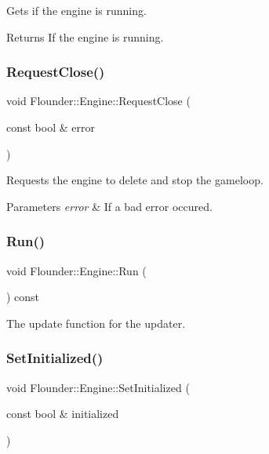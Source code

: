 Gets if the engine is running. 

\begin{DoxyReturn}{Returns}
If the engine is running. 
\end{DoxyReturn}
\mbox{\label{class_flounder_1_1_engine_abe7ee6fc6606fbc3aedc522585ee4930}} 
\subsubsection{\texorpdfstring{Request\+Close()}{RequestClose()}}
{\footnotesize\ttfamily void Flounder\+::\+Engine\+::\+Request\+Close (\begin{DoxyParamCaption}\item[{const bool \&}]{error }\end{DoxyParamCaption})}



Requests the engine to delete and stop the gameloop. 


\begin{DoxyParams}{Parameters}
{\em error} & If a bad error occured. \\
\hline
\end{DoxyParams}
\mbox{\label{class_flounder_1_1_engine_afb64e3656bdacc87a776202545d5adbf}} 
\subsubsection{\texorpdfstring{Run()}{Run()}}
{\footnotesize\ttfamily void Flounder\+::\+Engine\+::\+Run (\begin{DoxyParamCaption}{ }\end{DoxyParamCaption}) const}



The update function for the updater. 

\mbox{\label{class_flounder_1_1_engine_a4449438de1f74ae3ae0e9cad88abbc1f}} 
\subsubsection{\texorpdfstring{Set\+Initialized()}{SetInitialized()}}
{\footnotesize\ttfamily void Flounder\+::\+Engine\+::\+Set\+Initialized (\begin{DoxyParamCaption}\item[{const bool \&}]{initialized }\end{DoxyParamCaption})\hspace{0.3cm}{\ttfamily [inline]}}




